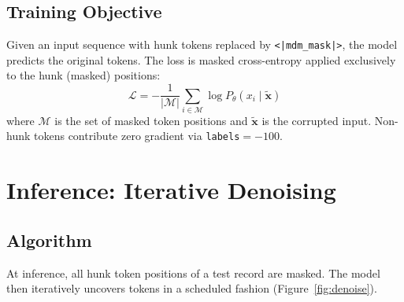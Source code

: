 \documentclass[11pt,a4paper]{article}
\begin{document}
\subsection{Training Objective}

Given an input sequence with hunk tokens replaced by \texttt{<|mdm\_mask|>}, the model predicts the original tokens. The loss is masked cross-entropy applied exclusively to the hunk (masked) positions:
\[
  \mathcal{L} = -\frac{1}{|\mathcal{M}|} \sum_{i \in \mathcal{M}} \log P_\theta(x_i \mid \tilde{\mathbf{x}})
\]
where $\mathcal{M}$ is the set of masked token positions and $\tilde{\mathbf{x}}$ is the corrupted input. Non-hunk tokens contribute zero gradient via \texttt{labels}$= -100$.

\section{Inference: Iterative Denoising}
\label{sec:inference}

\subsection{Algorithm}

At inference, all hunk token positions of a test record are masked. The model then iteratively uncovers tokens in a scheduled fashion (Figure~\ref{fig:denoise}).

\begin{algorithm}[H]
\caption{Confidence-Ordered Iterative Denoising (\texttt{infill\_denoise})}
\label{alg:denoise}
\begin{algorithmic}[1]
\Require Masked input $\tilde{\mathbf{x}}$, mask positions $\mathcal{M}$, steps $T$, temperature $\tau$
\State $\mathbf{x} \gets \tilde{\mathbf{x}}$;\quad $\text{still\_masked} \gets \mathcal{M}$
\State Compute linear schedule: $[k_1, \ldots, k_T]$ summing to $|\mathcal{M}|$
  \State $\mathbf{L} \gets \text{model}(\mathbf{x})$\hfill{}
   $\hat{\mathbf{x}} \gets \arg\max \mathbf{L}$\hfill{}
  \Else{} $\hat{\mathbf{x}} \gets$ Gumbel-max sample of $\mathbf{L}$ at temperature $\tau$
  \EndIf
  \State $\text{conf}_i \gets P_\theta(\hat{x}_i \mid \mathbf{x})$ for $i \in \text{still\_masked}$
  \State $\mathcal{T} \gets$ top-$k_t$ indices by $\text{conf}$\hfill{}}
  \State $\mathbf{x}[\mathcal{T}] \gets \hat{\mathbf{x}}[\mathcal{T}]$;\quad $\text{still\_masked} \gets \text{still\_masked} \setminus \mathcal{T}$
  \State $\mathbf{x}[\text{still\_masked}] \gets \texttt{<|mdm\_mask|>}$\hfill\Comment{Re-mask remaining}
\EndFor
\State \Return $\mathbf{x}$
\end{algorithmic}
\end{algorithm}
\end{document}
